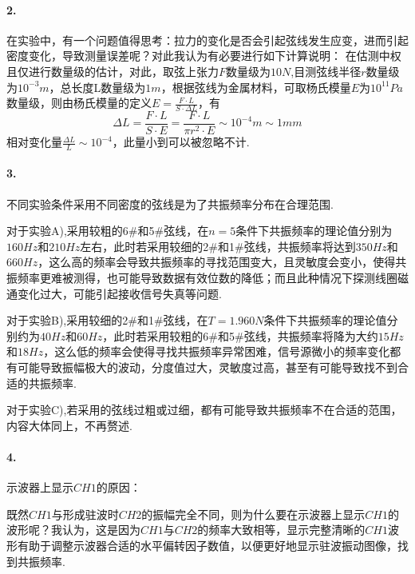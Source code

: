 \documentclass[UTF8]{ctexart}
\begin{document}
\paragraph{2.}在实验中，有一个问题值得思考：拉力的变化是否会引起弦线发生应变，进而引起密度变化，导致测量误差呢？对此我认为有必要进行如下计算说明：
在估测中权且仅进行数量级的估计，对此，取弦上张力$F$数量级为$10N$,目测弦线半径$r$数量级为$10^{-3}m$，总长度L数量级为$1m$，根据弦线为金属材料，可取杨氏模量$E$为$10^11Pa$数量级，则由杨氏模量的定义$E=\frac{F\cdot L}{S\cdot \Delta L}$，有
\[\Delta L = \frac{F\cdot L}{S\cdot E} = \frac{F\cdot L}{\pi r^2\cdot E}\sim10^{-4}m\sim1mm\]
相对变化量$\frac{\Delta L}{L}\sim10^{-4}$，此量小到可以被忽略不计.
\paragraph{3.}不同实验条件采用不同密度的弦线是为了共振频率分布在合理范围.\par 对于实验A),采用较粗的6\#和5\#弦线，在$n=5$条件下共振频率的理论值分别为$160Hz$和$210Hz$左右，此时若采用较细的2\#和1\#弦线，共振频率将达到$350Hz$和$660Hz$，这么高的频率会导致共振频率的寻找范围变大，且灵敏度会变小，使得共振频率更难被测得，也可能导致数据有效位数的降低；而且此种情况下探测线圈磁通变化过大，可能引起接收信号失真等问题.\par
对于实验B),采用较细的2\#和1\#弦线，在$T=1.960N$条件下共振频率的理论值分别约为$40Hz$和$60Hz$，此时若采用较粗的6\#和5\#弦线，共振频率将降为大约$15Hz$和$18Hz$，这么低的频率会使得寻找共振频率异常困难，信号源微小的频率变化都有可能导致振幅极大的波动，分度值过大，灵敏度过高，甚至有可能导致找不到合适的共振频率.\par
对于实验C),若采用的弦线过粗或过细，都有可能导致共振频率不在合适的范围，内容大体同上，不再赘述.
\paragraph{4.}示波器上显示$CH1$的原因：\par
既然$CH1$与形成驻波时$CH2$的振幅完全不同，则为什么要在示波器上显示$CH1$的波形呢？我认为，这是因为$CH1$与$CH2$的频率大致相等，显示完整清晰的$CH1$波形有助于调整示波器合适的水平偏转因子数值，以便更好地显示驻波振动图像，找到共振频率.
\end{document}
